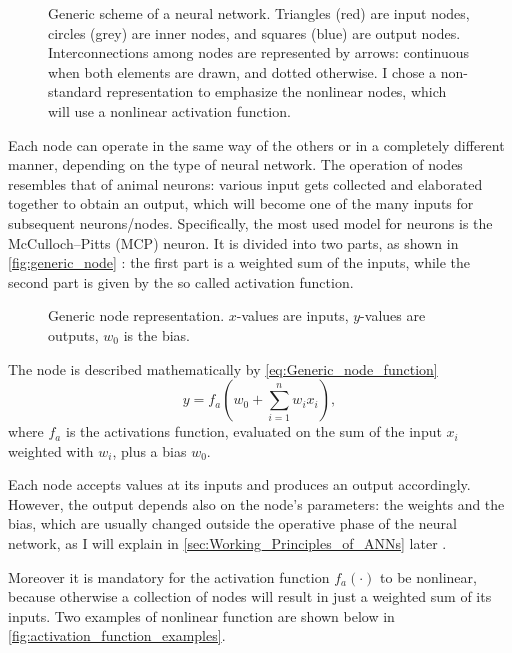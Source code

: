 \begin{figure}[ht]
	\centering
	
	\caption{	Generic scheme of a neural network. %
						Triangles (red) are input nodes, circles (grey) are inner nodes, and squares (blue) are output nodes. %
						Interconnections among nodes are represented by arrows: %
						continuous when both elements are drawn, and dotted otherwise. %
						I chose a non-standard representation to emphasize the nonlinear nodes, which will use a nonlinear activation function. %
						}
	\label{fig:generic_NN}
\end{figure}

Each node can operate in the same way of the others or in a completely different manner, depending on the type of neural network.
The operation of nodes resembles that of animal neurons: various input gets collected and elaborated together to obtain an output, which will become one of the many inputs for subsequent neurons/nodes.
Specifically, the most used model for neurons is the McCulloch–Pitts (MCP) neuron.
It is divided into two parts, as shown in \autoref{fig:generic_node} : the first part is a weighted sum of the inputs, while the second part is given by the so called activation function.

\begin{figure}[ht]
	\centering
	
	\caption{Generic node representation. $x$-values are inputs, $y$-values are outputs, $w_0$ is the bias.}
	\label{fig:generic_node}
\end{figure}
The node is described mathematically by \autoref{eq:Generic_node_function}
\begin{equation}
y = f_a \left(  w_0 + \sum_{i=1}^{n} w_i x_i \right),
\label{eq:Generic_node_function}
\end{equation}
where $f_a$ is the activations function, evaluated on the sum of the input $x_i$ weighted with $w_i$, plus a bias $w_0$.

Each node accepts values at its inputs and produces an output accordingly.
However, the output depends also on the node's parameters: the weights and the bias, which are usually changed outside the operative phase of the neural network, as I will explain in \autoref{sec:Working_Principles_of_ANNs} later .

Moreover it is mandatory for the activation function $f_a\left(\cdot\right)$ to be nonlinear, because otherwise a collection of nodes will result in just a weighted sum of its inputs.
Two examples of nonlinear function are shown below in \autoref{fig:activation_function_examples}.

